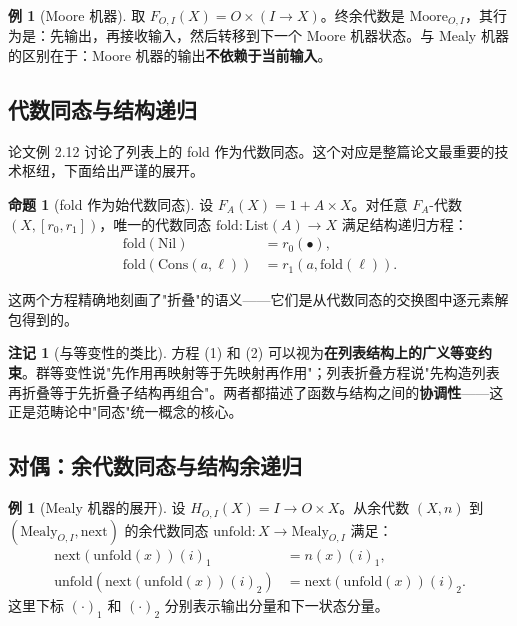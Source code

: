 \documentclass[12pt,a4paper]{ctexart}
\theoremstyle{definition}
\newtheorem{example}[definition]{例}
\newtheorem{remark}[definition]{注记}
\newtheorem{proposition}[definition]{命题}
\newcommand{\Moore}{\mathrm{Moore}}
\newcommand{\Mealy}{\mathrm{Mealy}}
\newcommand{\List}{\mathrm{List}}
\newcommand{\fold}{\mathrm{fold}}
\newcommand{\unfold}{\mathrm{unfold}}
\begin{document}
\begin{example}[Moore 机器]\label{ex:moore}
取 $F_{O,I}(X)=O\times(I\to X)$。终余代数是 $\Moore_{O,I}$，其行为是：先输出，再接收输入，然后转移到下一个 Moore 机器状态。与 Mealy 机器的区别在于：Moore 机器的输出\textbf{不依赖于当前输入}。
\end{example}

\subsection{代数同态与结构递归}

论文例 2.12 讨论了列表上的 fold 作为代数同态。这个对应是整篇论文最重要的技术枢纽，下面给出严谨的展开。

\begin{proposition}[fold 作为始代数同态]\label{prop:fold}
设 $F_A(X)=1+A\times X$。对任意 $F_A$-代数 $(X,[r_0,r_1])$，唯一的代数同态 $\fold:\List(A)\to X$ 满足结构递归方程：
\begin{align}
\fold(\mathrm{Nil}) &= r_0(\bullet),\\
\fold(\mathrm{Cons}(a,\ell)) &= r_1(a,\fold(\ell)).
\end{align}
\end{proposition}

这两个方程精确地刻画了"折叠"的语义——它们是从代数同态的交换图中逐元素解包得到的。

\begin{remark}[与等变性的类比]
方程 (1) 和 (2) 可以视为\textbf{在列表结构上的广义等变约束}。群等变性说"先作用再映射等于先映射再作用"；列表折叠方程说"先构造列表再折叠等于先折叠子结构再组合"。两者都描述了函数与结构之间的\textbf{协调性}——这正是范畴论中"同态"统一概念的核心。
\end{remark}

\subsection{对偶：余代数同态与结构余递归}

\begin{example}[Mealy 机器的展开]\label{ex:mealy-unfold}
设 $H_{O,I}(X)=I\to O\times X$。从余代数 $(X,n)$ 到 $(\Mealy_{O,I},\mathrm{next})$ 的余代数同态 $\unfold:X\to\Mealy_{O,I}$ 满足：
\begin{align}
\mathrm{next}(\unfold(x))(i)_1 &= n(x)(i)_1,\\
\unfold(\mathrm{next}(\unfold(x))(i)_2) &= \mathrm{next}(\unfold(x))(i)_2.
\end{align}
这里下标 $(\cdot)_1$ 和 $(\cdot)_2$ 分别表示输出分量和下一状态分量。
\end{example}
\end{document}
